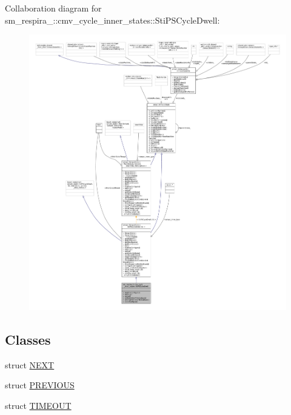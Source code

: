Collaboration diagram for sm\+\_\+respira\+\_\+:\+:cmv\+\_\+cycle\+\_\+inner\+\_\+states\+:\+:Sti\+P\+S\+Cycle\+Dwell\+:
\nopagebreak
\begin{figure}[H]
\begin{center}
\leavevmode
\includegraphics[width=350pt]{structsm__respira__1_1_1cmv__cycle__inner__states_1_1StiPSCycleDwell__coll__graph}
\end{center}
\end{figure}
\subsection*{Classes}
\begin{DoxyCompactItemize}
\item 
struct \hyperlink{structsm__respira__1_1_1cmv__cycle__inner__states_1_1StiPSCycleDwell_1_1NEXT}{N\+E\+XT}
\item 
struct \hyperlink{structsm__respira__1_1_1cmv__cycle__inner__states_1_1StiPSCycleDwell_1_1PREVIOUS}{P\+R\+E\+V\+I\+O\+US}
\item 
struct \hyperlink{structsm__respira__1_1_1cmv__cycle__inner__states_1_1StiPSCycleDwell_1_1TIMEOUT}{T\+I\+M\+E\+O\+UT}
\end{DoxyCompactItemize}
